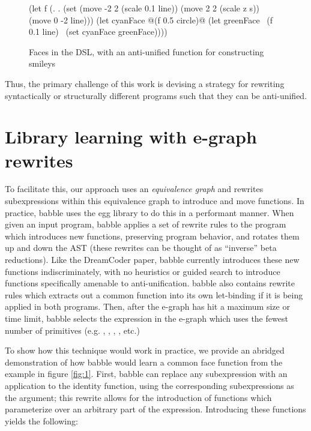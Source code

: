 \documentclass[acmsmall,nonacm]{acmart}\settopmatter{}
\begin{document}
\begin{figure}[h]
  \begin{nanoml}[xleftmargin=.1\textwidth]
(let f (\z. \s. (set (move -2 2 (scale 0.1 line)) (move 2 2 (scale z s)) (move 0 -2 line)))
  (let cyanFace @(f 0.5 circle)@
    (let greenFace ~(f 0.1 line)~
      (set cyanFace greenFace))))
  \end{nanoml}
  
  \caption{Faces in the DSL, with an anti-unified function for constructing smileys}
  \label{fig:2}
\end{figure}

Thus, the primary challenge of this work is devising a strategy for rewriting syntactically or structurally different programs such that they can be anti-unified.

\section{Library learning with e-graph rewrites}

To facilitate this, our approach uses an \textit{equivalence graph} and rewrites subexpressions within this equivalence graph to introduce and move functions. In practice, babble uses the egg library to do this in a performant manner. When given an input program, babble applies a set of rewrite rules to the program which introduces new functions, preserving program behavior, and rotates them up and down the AST (these rewrites can be thought of as ``inverse'' beta reductions). Like the DreamCoder paper, babble currently introduces these new functions indiscriminately, with no heuristics or guided search to introduce functions specifically amenable to anti-unification. babble also contains rewrite rules which extracts out a common function into its own let-binding if it is being applied in both programs. Then, after the e-graph has hit a maximum size or time limit, babble selects the expression in the e-graph which uses the fewest number of primitives (e.g. , , , , etc.)

To show how this technique would work in practice, we provide an abridged demonstration of how babble would learn a common face function from the example in figure \ref{fig:1}. First, babble can replace any subexpression with an application to the identity function, using the corresponding subexpressions as the argument; this rewrite allows for the introduction of functions which parameterize over an arbitrary part of the expression. Introducing these functions yields the following:
\end{document}
